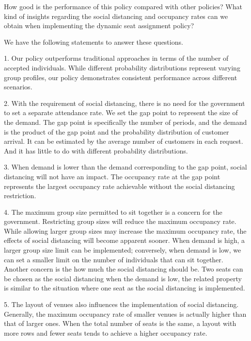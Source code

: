 How good is the performance of this policy compared with other policies? What kind of insights regarding the social distancing and occupancy rates can we obtain when implementing the dynamic seat assignment policy?

We have the following statements to answer these questions.



1. Our policy outperforms traditional approaches in terms of the number of accepted individuals. While different probability distributions represent varying group profiles, our policy demonstrates consistent performance across different scenarios.

2. With the requirement of social distancing, there is no need for the government to set a separate attendance rate. We set the gap point to represent the size of the demand. The gap point is specifically the number of periods, and the demand is the product of the gap point and the probability distribution of customer arrival. It can be estimated by the average number of customers in each request. And it has little to do with different probability distributions.

3. When demand is lower than the demand corresponding to the gap point, social distancing will not have an impact. The occupancy rate at the gap point represents the largest occupancy rate achievable without the social distancing restriction.

4. The maximum group size permitted to sit together is a concern for the government. Restricting group sizes will reduce the maximum occupancy rate. While allowing larger group sizes may increase the maximum occupancy rate, the effects of social distancing will become apparent sooner. When demand is high, a larger group size limit can be implemented; conversely, when demand is low, we can set a smaller limit on the number of individuals that can sit together. Another concern is the how much the social distancing should be. Two seats can be chosen as the social distancing when the demand is low, the related property is similar to the situation where one seat as the social distancing is implemented.

5. The layout of venues also influences the implementation of social distancing. Generally, the maximum occupancy rate of smaller venues is actually higher than that of larger ones. When the total number of seats is the same, a layout with more rows and fewer seats tends to achieve a higher occupancy rate.

